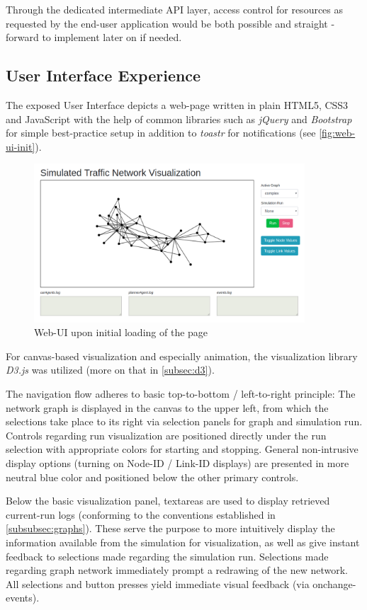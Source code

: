 Through the dedicated intermediate API layer, access control for resources as requested by the end-user application would be both possible and straight -forward to implement later on if needed.


\subsection{User Interface Experience}

The exposed User Interface depicts a web-page written in plain HTML5, CSS3 and JavaScript with the help of common libraries such as \textit{jQuery} and \textit{Bootstrap} for simple best-practice setup in addition to \textit{toastr} for notifications (see \autoref{fig:web-ui-init}).

\begin{figure}
    \centering
    \includegraphics[width=0.9\textwidth]{images/web-ui-init.png}
    \caption{Web-UI upon initial loading of the page}
    \label{fig:web-ui-init}
\end{figure}

For canvas-based visualization and especially animation, the visualization library \textit{D3.js} was utilized (more on that in \autoref{subsec:d3}).

The navigation flow adheres to basic top-to-bottom / left-to-right principle: The network graph is displayed in the canvas to the upper left, from which the selections take place to its right via selection panels for graph and simulation run. Controls regarding run visualization are positioned directly under the run selection with appropriate colors for starting and stopping. General non-intrusive display options (turning on Node-ID / Link-ID displays) are presented in more neutral blue color and positioned below the other primary controls.

Below the basic visualization panel, textareas are used to display retrieved current-run logs (conforming to the conventions established in \autoref{subsubsec:graphs}). These serve the purpose to more intuitively display the information available from the simulation for visualization, as well as give instant feedback to selections made regarding the simulation run. Selections made regarding graph network immediately prompt a redrawing of the new network. All selections and button presses yield immediate visual feedback (via onchange-events).

